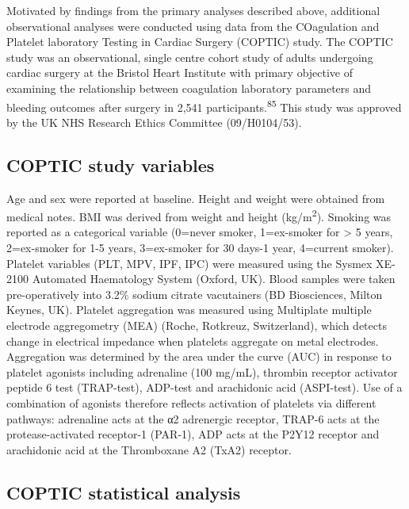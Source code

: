 \documentclass[11pt,twoside]{bristolthesis}
\begin{document}
Motivated by findings from the primary analyses described above, additional observational analyses were conducted using data from the COagulation and Platelet laboratory Testing in Cardiac Surgery (COPTIC) study. The COPTIC study was an observational, single centre cohort study of adults undergoing cardiac surgery at the Bristol Heart Institute with primary objective of examining the relationship between coagulation laboratory parameters and bleeding outcomes after surgery in 2,541 participants.\textsuperscript{85} This study was approved by the UK NHS Research Ethics Committee (09/H0104/53).

\hypertarget{coptic-study-variables}{%
\subsection{COPTIC study variables}\label{coptic-study-variables}}

Age and sex were reported at baseline. Height and weight were obtained from medical notes. BMI was derived from weight and height (kg/m\textsuperscript{2}). Smoking was reported as a categorical variable (0=never smoker, 1=ex-smoker for \textgreater{} 5 years, 2=ex-smoker for 1-5 years, 3=ex-smoker for 30 days-1 year, 4=current smoker). Platelet variables (PLT, MPV, IPF, IPC) were measured using the Sysmex XE-2100 Automated Haematology System (Oxford, UK). Blood samples were taken pre-operatively into 3.2\% sodium citrate vacutainers (BD Biosciences, Milton Keynes, UK). Platelet aggregation was measured using Multiplate multiple electrode aggregometry (MEA) (Roche, Rotkreuz, Switzerland), which detects change in electrical impedance when platelets aggregate on metal electrodes. Aggregation was determined by the area under the curve (AUC) in response to platelet agonists including adrenaline (100 mg/mL), thrombin receptor activator peptide 6 test (TRAP-test), ADP-test and arachidonic acid (ASPI-test). Use of a combination of agonists therefore reflects activation of platelets via different pathways: adrenaline acts at the α2 adrenergic receptor, TRAP-6 acts at the protease-activated receptor-1 (PAR-1), ADP acts at the P2Y12 receptor and arachidonic acid at the Thromboxane A2 (TxA2) receptor.

\hypertarget{coptic-statistical-analysis}{%
\subsection{COPTIC statistical analysis}\label{coptic-statistical-analysis}}
\end{document}
